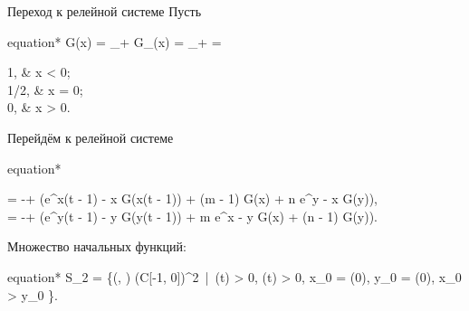 \begin{frame}{Переход к релейной системе}
	Пусть 
	\begin{empheq}[box=\myeq]{equation*}
		G(x) = \lim\limits_{\gamma \to +\infty} G_{\gamma}(x) = \lim\limits_{\gamma \to +\infty}  = \begin{cases}
			1, & x < 0;\\
			1/2, & x = 0;\\
			0, & x > 0.
		\end{cases}
	\end{empheq}
	
	Перейдём к релейной системе
	\footnotesize
	\begin{empheq}[box=\myeq]{equation*}
		\begin{cases}
			 = -\beta + \alpha \left(e^{x(t - 1) - x} G(x(t - 1)) + \delta (m - 1) G(x) + \delta n e^{y - x} G(y)\right),\\
			 = -\beta + \alpha \left(e^{y(t - 1) - y} G(y(t - 1)) + \delta m e^{x - y} G(x) + \delta (n - 1) G(y)\right).
		\end{cases}
	\end{empheq}
	\normalsize
	
	Множество начальных функций:
	\footnotesize
	\begin{empheq}[box=\myeq]{equation*}
		S_2 = \{(\varphi, \psi) \in (C[-1, 0])^2 \,|\, \varphi(t) > 0, \psi(t) > 0, x_0 = \varphi(0), y_0 = \psi(0), x_0 > y_0 \}.
	\end{empheq}
	\normalsize
\end{frame}
%
%	
%	

